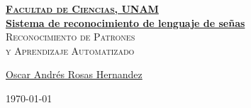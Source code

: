 \documentclass[12pt, fleqn]{report}                             %
\author{Oscar Andrés Rosas}                                     %
\theoremstyle{break}                                            %
\begin{document}
\begin{titlepage}
    
    \pagecolor{TitlePageColor}                                      %
    \color{white}                                                   %

    \vspace                                                         %
    \baselineskip                                                   %

    \makebox[0pt][l]{\rule{1.3\textwidth}{3pt}}                     %
    
    \href{https://compilandoconocimiento.com}                       %
    {\textbf{\textsc{\Huge Facultad de Ciencias, UNAM}}}\\[2.7cm]      %

    \href{\ProjectNameLink}                                         %
    {\fontsize{35}{42}\selectfont \textbf{Sistema de reconocimiento de lenguaje de señas}}\\[0.5cm] %
    \textcolor{ColorSubtext}{\textsc{\Huge Reconocimiento de Patrones \\y Aprendizaje Automatizado}}     %
    
    \vfill                                                          %
    
    \href{\ProjectAuthorLink}                                       %
    {\LARGE \textsf{Oscar Andrés Rosas Hernandez}}                  %

    \vspace                                                         %
    \baselineskip                                                   %
    
    {\large \textsf{\today}}                                        %

\end{titlepage}
\end{document}
